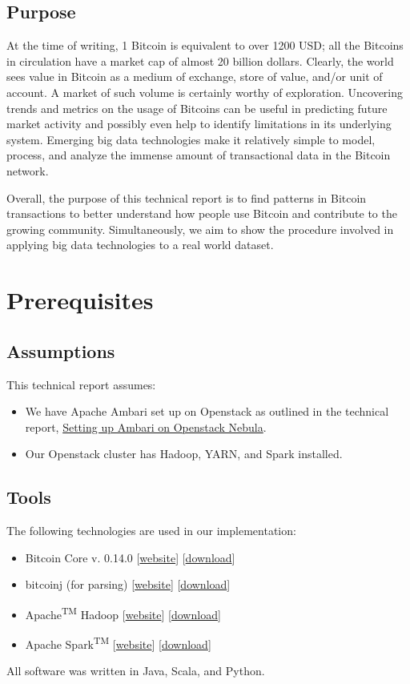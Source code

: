 \documentclass[9pt,twocolumn,twoside]{idsi}
\begin{document}
\subsection{Purpose}
At the time of writing, 1 Bitcoin is equivalent to over 1200 USD; all the Bitcoins in circulation have a market cap of almost 20 billion dollars. Clearly, the world sees value in Bitcoin as a medium of exchange, store of value, and/or unit of account. A market of such volume is certainly worthy of exploration. Uncovering trends and metrics on the usage of Bitcoins can be useful in predicting future market activity and possibly even help to identify limitations in its underlying system. Emerging big data technologies make it relatively simple to model, process, and analyze the immense amount of transactional data in the Bitcoin network.

Overall, the purpose of this technical report is to find patterns in Bitcoin transactions to better understand how people use Bitcoin and contribute to the growing community. Simultaneously, we aim to show the procedure involved in applying big data technologies to a real world dataset.

\section{Prerequisites}
\subsection{Assumptions}
This technical report assumes:
\begin{itemize}
    \item We have Apache Ambari set up on Openstack as outlined in the technical report, \href{https://github.com/lcdm-uiuc/idsi-core/blob/bitcoin_tr/reports/ambari_openstack_setup/ambari_openstack_setup.pdf}{Setting up Ambari on Openstack Nebula}.
    \item Our Openstack cluster has Hadoop, YARN, and Spark installed.
\end{itemize}
\subsection{Tools}
The following technologies are used in our implementation:
\begin{itemize}
    \item Bitcoin Core v. 0.14.0 [\href{https://bitcoin.org/en/bitcoin-core/}{website}] [\href{https://bitcoin.org/en/download}{download}]
    \item bitcoinj (for parsing) [\href{https://bitcoinj.github.io/}{website}] [\href{https://bitcoinj.github.io/#getting-started}{download}]
    \item Apache\textsuperscript{TM} Hadoop\textsuperscript{\textregistered} [\href{http://hadoop.apache.org}{website}] [\href{http://hadoop.apache.org/#Download+Hadoop}{download}]
    \item Apache Spark\textsuperscript{TM} [\href{http://spark.apache.org/}{website}] [\href{http://spark.apache.org/downloads.html}{download}]
\end{itemize}
All software was written in Java, Scala, and Python.
\end{document}
